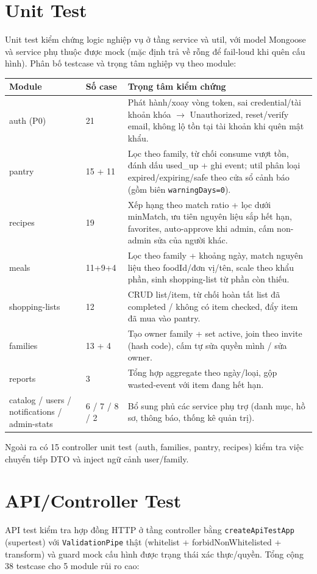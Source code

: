 \section{Unit Test}
Unit test kiểm chứng logic nghiệp vụ ở tầng service và util, với model Mongoose và service phụ thuộc được mock (mặc định trả về rỗng để fail-loud khi quên cấu hình). Phân bố testcase và trọng tâm nghiệp vụ theo module:

\begingroup
\renewcommand{\arraystretch}{1.5}
\begin{longtable}{|p{3cm}|p{1.8cm}|p{8.5cm}|}
\hline
\cellcolor[HTML]{D5F5E3}\textbf{Module} & \cellcolor[HTML]{D5F5E3}\textbf{Số case} & \cellcolor[HTML]{D5F5E3}\textbf{Trọng tâm kiểm chứng} \\ \hline
auth (P0) & 21 & Phát hành/xoay vòng token, sai credential/tài khoản khóa $\rightarrow$ Unauthorized, reset/verify email, không lộ tồn tại tài khoản khi quên mật khẩu. \\ \hline
pantry & 15 + 11 & Lọc theo family, từ chối consume vượt tồn, đánh dấu used\_up + ghi event; util phân loại expired/expiring/safe theo cửa sổ cảnh báo (gồm biên \texttt{warningDays=0}). \\ \hline
recipes & 19 & Xếp hạng theo match ratio + lọc dưới minMatch, ưu tiên nguyên liệu sắp hết hạn, favorites, auto-approve khi admin, cấm non-admin sửa của người khác. \\ \hline
meals & 11+9+4 & Lọc theo family + khoảng ngày, match nguyên liệu theo foodId/đơn vị/tên, scale theo khẩu phần, sinh shopping-list từ phần còn thiếu. \\ \hline
shopping-lists & 12 & CRUD list/item, từ chối hoàn tất list đã completed / không có item checked, đẩy item đã mua vào pantry. \\ \hline
families & 13 + 4 & Tạo owner family + set active, join theo invite (hash code), cấm tự sửa quyền mình / sửa owner. \\ \hline
reports & 3 & Tổng hợp aggregate theo ngày/loại, gộp wasted-event với item đang hết hạn. \\ \hline
catalog / users / notifications / admin-stats & 6 / 7 / 8 / 2 & Bổ sung phủ các service phụ trợ (danh mục, hồ sơ, thông báo, thống kê quản trị). \\ \hline
\end{longtable}
\endgroup

Ngoài ra có 15 controller unit test (auth, families, pantry, recipes) kiểm tra việc chuyển tiếp DTO và inject ngữ cảnh user/family.

\section{API/Controller Test}
API test kiểm tra hợp đồng HTTP ở tầng controller bằng \texttt{createApiTestApp} (supertest) với \texttt{ValidationPipe} thật (whitelist + forbidNonWhitelisted + transform) và guard mock cấu hình được trạng thái xác thực/quyền. Tổng cộng 38 testcase cho 5 module rủi ro cao:

